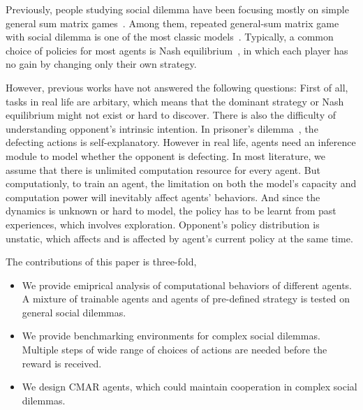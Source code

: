 \documentclass{article}
\begin{document}
Previously, people studying social dilemma have been focusing mostly on simple general sum matrix games~\cite{tullock1974social}.
Among them, repeated general-sum matrix game with social dilemma is one of the most classic models~\cite{bouzy2010multi, leibo2017multi}.
Typically, a common choice of policies for most agents is Nash equilibrium~\cite{maskin1999Nash, tullock1974social, bouzy2010multi},
in which each player has no gain by changing only their own strategy.

However, previous works have not answered the following questions:
First of all, tasks in real life are arbitary, which means that
the dominant strategy or Nash equilibrium might not exist or hard to discover.
There is also the difficulty of understanding opponent's intrinsic intention.
In prisoner's dilemma~\cite{nowak1993strategy}, the defecting actions is self-explanatory.
However in real life, agents need an inference module to model whether the opponent is defecting.
In most literature, we assume that there is unlimited computation resource for every agent.
But computationly, to train an agent,
the limitation on both the model's capacity and computation power will inevitably affect agents' behaviors.
And since the dynamics is unknown or hard to model,
the policy has to be learnt from past experiences, which involves exploration.
Opponent's policy distribution is unstatic,
which affects and is affected by agent's current policy at the same time.

The contributions of this paper is three-fold, 
\begin{itemize}
\item We provide emiprical analysis of computational behaviors of different agents.
A mixture of trainable agents and agents of pre-defined strategy is tested on general social dilemmas.
\item We provide benchmarking environments for complex social dilemmas.
Multiple steps of wide range of choices of actions are needed before the reward is received.
\item We design CMAR agents, which could maintain cooperation in complex social dilemmas.
\end{itemize}
% 
\end{document}
